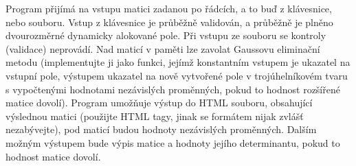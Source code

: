 Program přijímá na vstupu matici zadanou po řádcích, a to buď z klávesnice, nebo souboru. Vstup z klávesnice je průběžně validován, a průběžně je plněno dvourozměrné dynamicky alokované pole. Při vstupu ze souboru se kontroly (validace) neprovádí. Nad maticí v paměti lze zavolat Gaussovu eliminační metodu (implementujte ji jako funkci, jejímž konstantním vstupem je ukazatel na vstupní pole, výstupem ukazatel na nově vytvořené pole v trojúhelníkovém tvaru s vypočtenými hodnotami nezávislých proměnných, pokud to hodnost rozšířené matice dovolí). Program umožňuje výstup do H\+T\+ML souboru, obsahující výslednou matici (použijte H\+T\+ML tagy, jinak se formátem nijak zvlášť nezabývejte), pod maticí budou hodnoty nezávislých proměnných. Dalším možným výstupem bude výpis matice a hodnoty jejího determinantu, pokud to hodnost matice dovolí. 